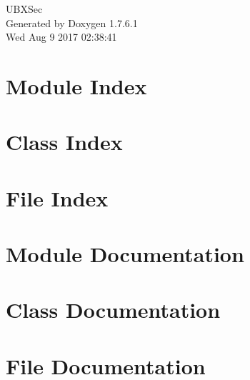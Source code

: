 \documentclass[a4paper]{book}
\begin{document}
\hypersetup{pageanchor=false,citecolor=blue}
\begin{titlepage}
\vspace*{7cm}
\begin{center}
{\Large \-U\-B\-X\-Sec }\\
\vspace*{1cm}
{\large \-Generated by Doxygen 1.7.6.1}\\
\vspace*{0.5cm}
{\small Wed Aug 9 2017 02:38:41}\\
\end{center}
\end{titlepage}
\clearemptydoublepage
{}
\tableofcontents
\clearemptydoublepage
{}
\hypersetup{pageanchor=true,citecolor=blue}
\chapter{\-Module \-Index}

\chapter{\-Class \-Index}

\chapter{\-File \-Index}

\chapter{\-Module \-Documentation}

\chapter{\-Class \-Documentation}


















\chapter{\-File \-Documentation}




\printindex
\end{document}
